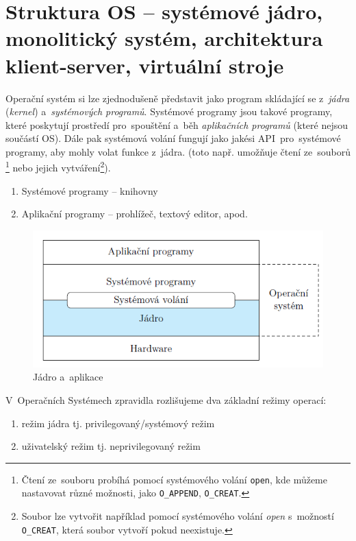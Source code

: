 
\section{Struktura OS -- systémové jádro, monolitický systém, architektura klient-server, virtuální stroje}
\label{kernel}

Operační systém si lze zjednodušeně představit jako program skládající se z~\emph{jádra} (\emph{kernel}) a~\emph{systémových programů}. Systémové programy jsou takové programy, které poskytují prostředí pro~spouštění a~běh \emph{aplikačních programů} (které nejsou součástí OS). Dále pak systémová volání fungují jako jakési API~pro~systémové programy, aby mohly volat funkce z~jádra. (toto např. umožňuje čtení ze~souborů \footnote{Čtení ze~souboru probíhá pomocí systémového volání \texttt{open}, kde můžeme nastavovat různé možnosti, jako \texttt{O\_APPEND}, \texttt{O\_CREAT}.} nebo jejich vytváření\footnote{Soubor lze vytvořit například pomocí systémového volání \emph{open} s~možností \texttt{O\_CREAT}, která soubor vytvoří pokud neexistuje.}).

\begin{enumerate}[noitemsep]
	\item Systémové programy -- knihovny
	\item Aplikační programy -- prohlížeč, textový editor, apod.
\end{enumerate}

\begin{figure}[ht]
	\centering
	\includegraphics[scale=1]{images/OS_kernel_apps.png}
	\caption{Jádro a~aplikace}
	\label{OS_kernel_apps}
\end{figure}

V~Operačních Systémech zpravidla rozlišujeme dva základní režimy operací:

\begin{enumerate}[noitemsep]
	\item režim jádra tj. privilegovaný/systémový režim
	\item uživatelský režim tj. neprivilegovaný režim
\end{enumerate}

